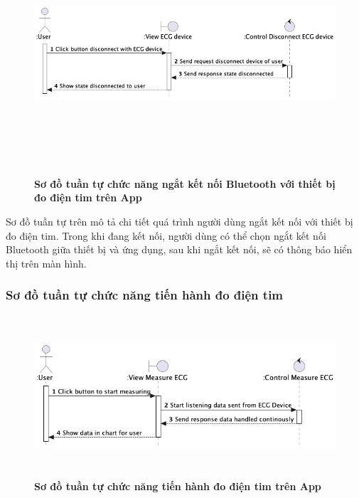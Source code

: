   \begin{figure}[H]
        \centering
        \includegraphics[width=16cm,height=9cm]{Images/mobile_app/disconnect_with_device.png}
        \caption[Sơ đồ tuần tự chức năng ngắt kết nối Bluetooth với thiết bị đo điện tim trên App]{\bfseries \fontsize{12pt}{0pt}
        \selectfont Sơ đồ tuần tự chức năng ngắt kết nối Bluetooth với thiết bị đo điện tim trên App}
        \label{disconnect_with_device} %
  \end{figure}

  Sơ đồ tuần tự trên mô tả chi tiết quá trình người dùng ngắt kết nối với thiết bị đo điện tim. Trong khi đang kết nối, người dùng
  có thể chọn ngắt kết nối Bluetooth giữa thiết bị và ứng dụng, sau khi ngắt kết nối, sẽ có thông báo
  hiển thị trên màn hình.

\subsubsection{Sơ đồ tuần tự chức năng tiến hành đo điện tim}
\mbox{}

  \begin{figure}[H]
        \centering
        \includegraphics[width=12cm,height=6cm]{Images/mobile_app/start_measuring_ecg.png}
        \caption[Sơ đồ tuần tự chức năng tiến hành đo điện tim trên App]{\bfseries \fontsize{12pt}{0pt}
        \selectfont Sơ đồ tuần tự chức năng tiến hành đo điện tim trên App}
        \label{start_measuring_ecg} %
  \end{figure}
 
